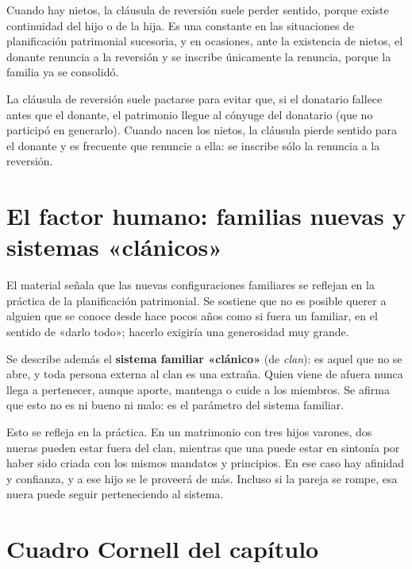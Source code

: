 \documentclass[12pt,oneside]{book}
\begin{document}
Cuando hay nietos, la cláusula de reversión suele perder sentido, porque existe continuidad del hijo o de la hija. Es una constante en las situaciones de planificación patrimonial sucesoria, y en ocasiones, ante la existencia de nietos, el donante renuncia a la reversión y se inscribe únicamente la renuncia, porque la familia ya se consolidó.

\begin{important}
La cláusula de reversión suele pactarse para evitar que, si el donatario fallece antes que el donante, el patrimonio llegue al cónyuge del donatario (que no participó en generarlo). Cuando nacen los nietos, la cláusula pierde sentido para el donante y es frecuente que renuncie a ella: se inscribe sólo la renuncia a la reversión.
\end{important}

\section{El factor humano: familias nuevas y sistemas «clánicos»}

El material señala que las nuevas configuraciones familiares se reflejan en la práctica de la planificación patrimonial. Se sostiene que no es posible querer a alguien que se conoce desde hace pocos años como si fuera un familiar, en el sentido de «darlo todo»; hacerlo exigiría una generosidad muy grande.

Se describe además el \textbf{sistema familiar «clánico»} (de \textit{clan}): es aquel que no se abre, y toda persona externa al clan es una extraña. Quien viene de afuera nunca llega a pertenecer, aunque aporte, mantenga o cuide a los miembros. Se afirma que esto no es ni bueno ni malo: es el parámetro del sistema familiar.

Esto se refleja en la práctica. En un matrimonio con tres hijos varones, dos nueras pueden estar fuera del clan, mientras que una puede estar en sintonía por haber sido criada con los mismos mandatos y principios. En ese caso hay afinidad y confianza, y a ese hijo se le proveerá de más. Incluso si la pareja se rompe, esa nuera puede seguir perteneciendo al sistema.

\section{Cuadro Cornell del capítulo}
\end{document}
